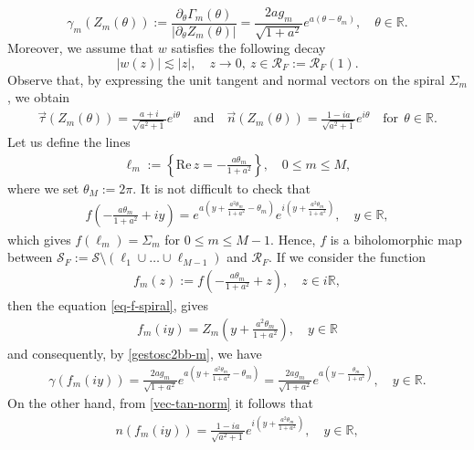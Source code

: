 \documentclass[11pt, letterpaper, reqno]{amsart}
\numberwithin{equation}{section}
\theoremstyle{definition}
\theoremstyle{plain}
\numberwithin{equation}{section}
\def\R{\mathbb{R}}
\def\RR{\mathcal{R}}
\def\SS{\mathcal{S}}
\begin{document}
\begin{equation}\label{gestosc2bb-m}
\gamma_{m}(Z_{m}(\theta)):=\frac{\partial_\theta \Gamma_{m}(\theta)}{|\partial_\theta Z_{m}(\theta)|} =
\frac{2ag_{m}}{\sqrt{1+a^{2}}} e^{a(\theta-\theta_{m})}, \quad \theta\in\R.
\end{equation}
Moreover, we assume that $w$ satisfies the following decay
\begin{equation}\label{decay-m}
|w(z)| \lesssim |z|, \quad z\to 0, \ z\in\RR_{F}:=\RR_{F}(1).
\end{equation}
Observe that, by expressing the unit tangent and normal vectors on the spiral $\Sigma_{m}$, we obtain
\begin{align}\label{vec-tan-norm}
\vec{\tau}(Z_{m}(\theta)) = \frac{a+i}{\sqrt{a^2+1}} e^{i\theta} \quad\text{and}\quad \vec{n}(Z_{m}(\theta))=\frac{1-ia}{\sqrt{a^2+1}} e^{i\theta} \quad\text{for} \ \ \theta\in\R.
\end{align}
Let us define the lines
\begin{align*}
\ell_{m} := \left\{\mathrm{Re}\, z = -\frac{a\theta_{m}}{1+a^{2}}\right\}, \quad 0\le m \le M,
\end{align*}
where we set $\theta_{M}:=2\pi$. It is not difficult to check that 
\begin{align}\label{eq-f-spiral}
f\left(-\frac{a\theta_{m}}{1+a^{2}} + iy\right) 
= e^{a(y+\frac{a^{2}\theta_{m}}{1+a^{2}} - \theta_{m})} e^{i(y+\frac{a^{2}\theta_{m}}{1+a^{2}})}, \quad y\in \R,
\end{align}
which gives $f(\ell_{m})=\Sigma_{m}$ for $0\le m\le M-1$. Hence, $f$ is a biholomorphic map between $\SS_{F}:=\SS\setminus(\ell_{1}\cup\ldots\cup\ell_{M-1})$ and $\RR_{F}$. If we consider the function 
\begin{align*}
f_{m}(z) := f\left(-\frac{a\theta_{m}}{1+a^{2}} + z\right), \quad z\in i\R,
\end{align*}
then the equation \eqref{eq-f-spiral}, gives
\begin{align*}
f_{m}(iy) = Z_{m}\left(y+\frac{a^{2}\theta_{m}}{1+a^{2}}\right), \quad y\in\R
\end{align*}
and consequently, by \eqref{gestosc2bb-m}, we have
\begin{align}\label{cond-gamma-m}
\gamma(f_{m}(iy)) = \frac{2ag_{m}}{\sqrt{1+a^{2}}} e^{a(y + \frac{a^{2}\theta_{m}}{1+a^{2}} - \theta_{m})} = 
\frac{2ag_{m}}{\sqrt{1+a^{2}}} e^{a(y - \frac{\theta_{m}}{1+a^{2}})}, \quad y\in\R.
\end{align}
On the other hand, from \eqref{vec-tan-norm} it follows that
\begin{align*}
n(f_{m}(iy)) = \frac{1-ia}{\sqrt{a^2+1}} e^{i(y+\frac{a^{2}\theta_{m}}{1+a^{2}})}, \quad y\in\R,
\end{align*}
\end{document}
